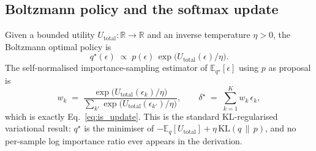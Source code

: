 \documentclass{article}
\begin{document}
\subsection{Boltzmann policy and the softmax update}
\label{app:is_theory:boltzmann}
Given a bounded utility $U_{\text{total}}:\mathbb{R}\to\mathbb{R}$ and an
inverse temperature $\eta>0$, the Boltzmann optimal policy is
\begin{equation*}
  q^{\star}(\epsilon) \;\propto\; p(\epsilon)\,\exp\!\bigl(U_{\text{total}}(\epsilon)/\eta\bigr).
\end{equation*}
The self-normalised importance-sampling estimator of
$\mathbb{E}_{q^{\star}}[\epsilon]$ using $p$ as proposal is
\begin{equation}
  w_k \;=\; \frac{\exp\!\bigl(U_{\text{total}}(\epsilon_k)/\eta\bigr)}
                 {\sum_{k'}\exp\!\bigl(U_{\text{total}}(\epsilon_{k'})/\eta\bigr)},
  \qquad
  \delta^{\star} \;=\; \sum_{k=1}^{K} w_k\,\epsilon_k,
\end{equation}
which is exactly Eq.~\ref{eq:is_update}. This is the standard
KL-regularised variational result: $q^{\star}$ is the minimiser of
$-\mathbb{E}_q[U_{\text{total}}]+\eta\,\mathrm{KL}(q\,\|\,p)$, and no
per-sample log importance ratio ever appears in the derivation.
\end{document}
